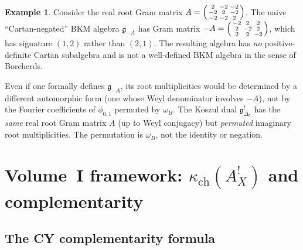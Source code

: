 \documentclass[11pt]{article}
\theoremstyle{definition}
\newtheorem{example}[theorem]{Example}
\theoremstyle{remark}
\newcommand{\fkg}{\mathfrak{g}}
\begin{document}
\begin{example}
Consider the real root Gram matrix
$A = \begin{psmallmatrix} 2 & -2 & -2 \\ -2 & 2 & -2 \\
-2 & -2 & 2 \end{psmallmatrix}$.
The naive ``Cartan-negated'' BKM algebra $\fkg_{-A}$ has Gram
matrix $-A = \begin{psmallmatrix} -2 & 2 & 2 \\ 2 & -2 & 2 \\
2 & 2 & -2 \end{psmallmatrix}$, which has signature $(1, 2)$ rather
than $(2, 1)$. The resulting algebra has \emph{no} positive-definite
Cartan subalgebra and is not a well-defined BKM algebra in the sense
of Borcherds.

Even if one formally defines $\fkg_{-A}$, its root
multiplicities would be determined by a different automorphic form
(one whose Weyl denominator involves $-A$), not by the Fourier
coefficients of $\phi_{0,1}$ permuted by $\omega_B$. The Koszul dual
$\fkg_{\Delta_5}^!$ has the \emph{same} real root Gram matrix $A$
(up to Weyl conjugacy) but \emph{permuted} imaginary root
multiplicities. The permutation is $\omega_B$, not the identity or
negation.
\end{example}


\section{Volume~I framework: $\kappa_{\mathrm{ch}}(A^!_X)$ and complementarity}
\label{sec:vol1}

\subsection{The CY complementarity formula}
\end{document}
